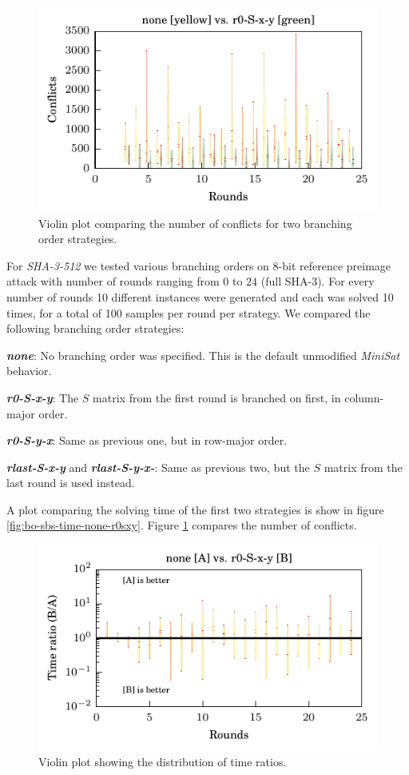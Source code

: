 \begin{figure}
\centering \includegraphics{figures/bo-ex1/sbs-confl-none-r0sxy.pdf}
\caption{Violin plot comparing the number of conflicts for two branching order strategies.}
\label{fig:bo-sbs-confl-none-r0sxy}
\end{figure}

For \emph{SHA-3-512} we tested various branching orders on $8$-bit reference preimage attack with number of rounds ranging from $0$ to $24$ (full SHA-3).
For every number of rounds 10 different instances were generated and each was solved 10 times, for a total of 100 samples per round per strategy.
We compared the following branching order strategies:

\textbf{\emph{none}}: No branching order was specified. This is the default unmodified \emph{MiniSat} behavior.

\textbf{\emph{r0-S-x-y}}: The $S$ matrix from the first round is branched on first, in column-major order.

\textbf{\emph{r0-S-y-x}}: Same as previous one, but in row-major order.

\textbf{\emph{rlast-S-x-y}} and \textbf{\emph{rlast-S-y-x-}}: Same as previous two, but the $S$ matrix from the last round is used instead.	

A plot comparing the solving time of the first two strategies is show in figure \ref{fig:bo-sbs-time-none-r0sxy}.
Figure \ref{fig:bo-sbs-confl-none-r0sxy} compares the number of conflicts.

\begin{figure}
\centering \includegraphics{figures/bo-ex1/ratio-time-none-r0sxy.pdf}
\caption{Violin plot showing the distribution of time ratios.}
\label{fig:bo-ratio-time-none-r0sxy}
\end{figure}

